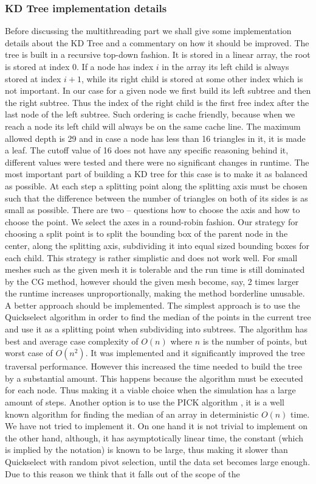 \subsubsection{KD Tree implementation details}
Before discussing the multithreading part we shall give some implementation details about the KD Tree and a commentary on how it should be improved. The tree is built in a recursive top-down fashion. It is stored in a linear array, the root is stored at index 0. If a node has index $i$ in the array its left child is always stored at index $i+1$, while its right child is stored at some other index which is not important. In our case for a given node we first build its left subtree and then the right subtree. Thus the index of the right child is the first free index after the last node of the left subtree. Such ordering is cache friendly, because when we reach a node its left child will always be on the same cache line. The maximum allowed depth is 29 and in case a node has less than 16 triangles in it, it is made a leaf. The cutoff value of 16 does not have any specific reasoning behind it, different values were tested and there were no significant changes in runtime. The most important part of building a KD tree for this case is to make it as balanced as possible. At each step a splitting point along the splitting axis must be chosen such that the difference between the number of triangles on both of its sides is as small as possible. There are two -- questions how to choose the axis and how to choose the point. We select the axes in a round-robin fashion. Our strategy for choosing a split point is to split the bounding box of the parent node in the center, along the splitting axis, subdividing it into equal sized bounding boxes for each child. This strategy is rather simplistic and does not work well. For small meshes such as the given mesh it is tolerable and the run time is still dominated by the CG method, however should the given mesh become, say, 2 times larger  the runtime increases unproportionally, making the method borderline unusable. A better approach should be implemented. The simplest approach is to use the Quickselect algorithm \cite{introduction-to-algorithms} in order to find the median of the points in the current tree and use it as a splitting point when subdividing into subtrees. The algorithm has best and average case complexity of $O(n)$ where $n$ is the number of points, but worst case of $O(n^2)$. It was implemented and it significantly improved the tree traversal performance. However this increased the time needed to build the tree by a substantial amount. This happens because the algorithm must be executed for each node. Thus making it a viable choice when the simulation has a large amount of steps. Another option is to use the PICK algorithm \cite{pick}, it is a well known algorithm for finding the median of an array in deterministic $O(n)$ time. We have not tried to implement it. On one hand it is not trivial to implement on the other hand, although, it has asymptotically linear time, the constant (which is implied by the notation) is known to be large, thus making it slower than Quickselect with random pivot selection, until the data set becomes large enough. Due to this reason we think that it falls out of the scope of the 